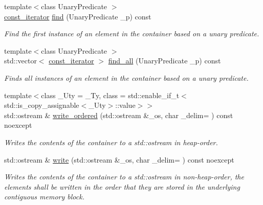 \begin{DoxyCompactItemize}
{\footnotesize template$<$class Unary\+Predicate $>$ }\\\hyperlink{classcrsc_1_1priority__queue_a35736d93262db4fdd6d4a71bf785f9b9}{const\+\_\+iterator} \hyperlink{classcrsc_1_1priority__queue_a21f89662e99dc2f3d2d226bb7973496e}{find} (Unary\+Predicate \+\_\+p) const 
\begin{DoxyCompactList}\small\item\em Find the first instance of an element in the container based on a unary predicate. \end{DoxyCompactList}\item 
{\footnotesize template$<$class Unary\+Predicate $>$ }\\std\+::vector$<$ \hyperlink{classcrsc_1_1priority__queue_a35736d93262db4fdd6d4a71bf785f9b9}{const\+\_\+iterator} $>$ \hyperlink{classcrsc_1_1priority__queue_ad759259910ae44d561c6575f3af8d82c}{find\+\_\+all} (Unary\+Predicate \+\_\+p) const 
\begin{DoxyCompactList}\small\item\em Finds all instances of an element in the container based on a unary predicate. \end{DoxyCompactList}\item 
{\footnotesize template$<$class \+\_\+\+Uty  = \+\_\+\+Ty, class  = std\+::enable\+\_\+if\+\_\+t$<$std\+::is\+\_\+copy\+\_\+assignable$<$\+\_\+\+Uty$>$\+::value$>$$>$ }\\std\+::ostream \& \hyperlink{classcrsc_1_1priority__queue_adef837b2da436690c8a1e2214c47bac9}{write\+\_\+ordered} (std\+::ostream \&\+\_\+os, char \+\_\+delim= \textquotesingle{} \textquotesingle{}) const  noexcept
\begin{DoxyCompactList}\small\item\em Writes the contents of the container to a {\ttfamily std\+::ostream} in heap-\/order. \end{DoxyCompactList}\item 
std\+::ostream \& \hyperlink{classcrsc_1_1priority__queue_ac279b3a3936989a66c9d65fa922edcab}{write} (std\+::ostream \&\+\_\+os, char \+\_\+delim= \textquotesingle{} \textquotesingle{}) const  noexcept
\begin{DoxyCompactList}\small\item\em Writes the contents of the container to a {\ttfamily std\+::ostream} in non-\/heap-\/order, the elements shall be written in the order that they are stored in the underlying contiguous memory block. \end{DoxyCompactList}\item 

\end{DoxyCompactItemize}
